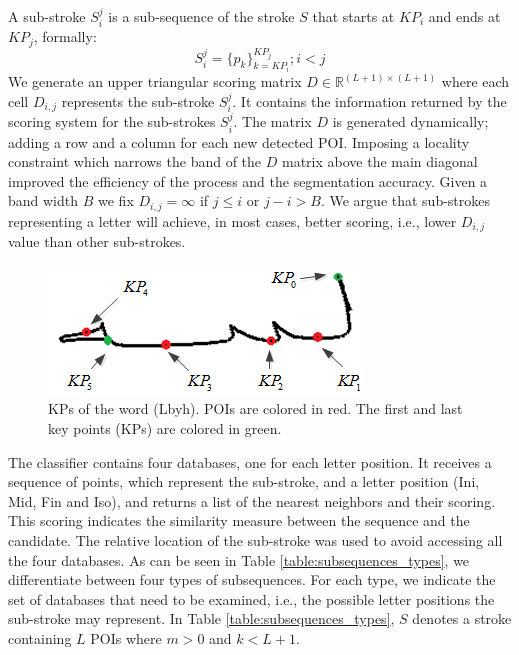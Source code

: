 \documentclass[10pt, conference, compsocconf]{IEEEtran}
\begin{document}
A sub-stroke $S_{i}^{j}$ is a sub-sequence of the stroke $S$ that starts at $KP_{i}$ and ends at $KP_{j}$, formally:
\begin{equation}
S_{i}^{j}=\{p_{k}\}_{k=KP_{i}}^{KP_{j}}; i<j
\end{equation}
We generate an upper triangular scoring matrix $D\in\mathbb{R}^{(L+1)\times (L+1)}$ where each cell $D_{i,j}$ represents the sub-stroke $S_i^j$. It contains the information returned by the scoring system for the sub-strokes $S_i^j$. 
The matrix $D$ is generated dynamically; adding a row and a column for each new detected POI. 
Imposing a locality constraint which narrows the band of the $D$ matrix above the main diagonal improved the efficiency of the process and the segmentation accuracy. 
Given a band width $B$ we fix $D_{i,j}=\infty$ if  $j \leq i$ or $j-i>B$.
We argue that sub-strokes representing a letter will achieve, in most cases, better scoring, i.e., lower $D_{i,j}$ value than other sub-strokes.\\

\begin{figure}
\centering
\includegraphics[width=0.6\columnwidth]{./figures/candidate_points}
\caption{KPs of the word  (Lbyh). POIs are colored in red. The first and last key points (KPs) are colored in green. }
\label{fig:candidate_points}
\end{figure}

The classifier contains four databases, one for each letter position. 
It receives a sequence of points, which represent the sub-stroke, and a letter position (Ini, Mid, Fin and Iso), and returns a list of the nearest neighbors and their scoring. 
This scoring indicates the similarity measure between the sequence and the candidate.
The relative location of the sub-stroke was used to avoid accessing all the four databases. 
As can be seen in Table \ref{table:subsequences_types}, we differentiate between four types of subsequences. 
For each type, we indicate the set of databases that need to be examined, i.e., the possible letter positions the sub-stroke may represent. 
In Table \ref{table:subsequences_types}, $S$ denotes a stroke containing $L$ POIs where $m>0$ and $k<L+1$.\\
\end{document}

